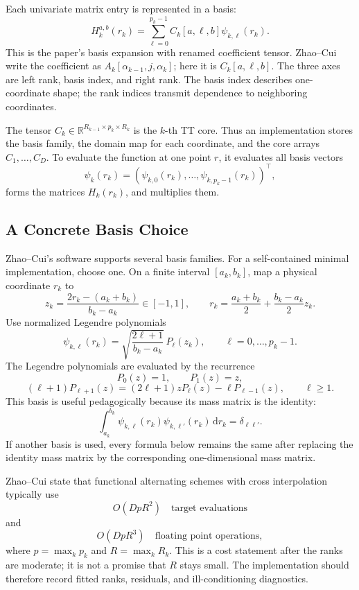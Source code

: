 \documentclass[11pt]{article}
\newcommand{\R}{\mathbb R}
\newcommand{\dd}{\,\mathrm d}
\begin{document}
Each univariate matrix entry is represented in a basis:
\[
    H_k^{a,b}(r_k)
    =
    \sum_{\ell=0}^{p_k-1}
    C_k[a,\ell,b]\psi_{k,\ell}(r_k).
    \tag{TT-3}
\]
This is the paper's basis expansion with renamed coefficient tensor.  Zhao--Cui
write the coefficient as \(A_k[\alpha_{k-1},j,\alpha_k]\); here it is
\(C_k[a,\ell,b]\).  The three axes are left rank, basis index, and right rank.
The basis index describes one-coordinate shape; the rank indices transmit
dependence to neighboring coordinates.

The tensor \(C_k\in\R^{R_{k-1}\times p_k\times R_k}\) is the \(k\)-th TT core.
Thus an implementation stores the basis family, the domain map for each
coordinate, and the core arrays \(C_1,\ldots,C_D\).  To evaluate the function at
one point \(r\), it evaluates all basis vectors
\[
    \psi_k(r_k)
    =
    (\psi_{k,0}(r_k),\ldots,\psi_{k,p_k-1}(r_k))^\top,
\]
forms the matrices \(H_k(r_k)\), and multiplies them.

\subsection{A Concrete Basis Choice}

Zhao--Cui's software supports several basis families.  For a self-contained
minimal implementation, choose one.  On a finite interval
\([a_k,b_k]\), map a physical coordinate \(r_k\) to
\[
    z_k=\frac{2r_k-(a_k+b_k)}{b_k-a_k}\in[-1,1],
    \qquad
    r_k=\frac{a_k+b_k}{2}+\frac{b_k-a_k}{2}z_k.
    \tag{TT-6}
\]
Use normalized Legendre polynomials
\[
    \psi_{k,\ell}(r_k)
    =
    \sqrt{\frac{2\ell+1}{b_k-a_k}}\,
    P_\ell(z_k),
    \qquad \ell=0,\ldots,p_k-1.
    \tag{TT-7}
\]
The Legendre polynomials are evaluated by the recurrence
\[
    P_0(z)=1,\qquad P_1(z)=z,
\]
\[
    (\ell+1)P_{\ell+1}(z)
    =
    (2\ell+1)zP_\ell(z)-\ell P_{\ell-1}(z),
    \qquad \ell\ge1.
    \tag{TT-8}
\]
This basis is useful pedagogically because its mass matrix is the identity:
\[
    \int_{a_k}^{b_k}\psi_{k,\ell}(r_k)\psi_{k,\ell'}(r_k)\dd r_k
    =
    \delta_{\ell\ell'}.
    \tag{TT-9}
\]
If another basis is used, every formula below remains the same after replacing
the identity mass matrix by the corresponding one-dimensional mass matrix.

Zhao--Cui state that functional alternating schemes with cross interpolation
typically use
\[
    O(DpR^2)\quad\text{target evaluations}
    \tag{TT-10}
\]
and
\[
    O(DpR^3)\quad\text{floating point operations},
    \tag{TT-11}
\]
where \(p=\max_k p_k\) and \(R=\max_k R_k\).  This is a cost statement after
the ranks are moderate; it is not a promise that \(R\) stays small.  The
implementation should therefore record fitted ranks, residuals, and
ill-conditioning diagnostics.
\end{document}
